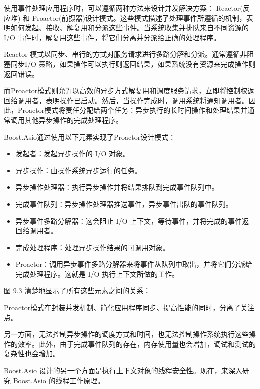 使用事件处理应用程序时，可以遵循两种方法来设计并发解决方案： Reactor(反应堆) 和 Proactor(前摄器)设计模式。这些模式描述了处理事件所遵循的机制，表明如何发起、接收、解复用和分派这些事件。当系统收集并排队来自不同资源的 I/O 事件时，解复用这些事件，将它们分离并分派给正确的处理程序。

Reactor 模式以同步、串行的方式对服务请求进行多路分解和分派。通常遵循非阻塞同步I/O 策略，如果操作可以执行则返回结果，如果系统没有资源来完成操作则返回错误。

而Proactor模式则允许以高效的异步方式解复用和调度服务请求，立即将控制权返回给调用者，表明操作已启动。然后，当操作完成时，调用系统将通知调用者。因此，Proactor模式将责任分配给两个任务：异步执行的长时间操作和处理结果并通常调用其他异步操作的完成处理程序。

Boost.Asio通过使用以下元素实现了Proactor设计模式：

\begin{itemize}
\item
发起者：发起异步操作的 I/O 对象。

\item
异步操作：由操作系统异步运行的任务。

\item
异步操作处理器：执行异步操作并将结果排队到完成事件队列中。

\item
完成事件队列：异步操作处理器推送事件，异步事件出队的事件队列。

\item
异步事件多路分解器：这会阻止 I/O 上下文，等待事件，并将完成的事件返回给调用者。

\item
完成处理程序：处理异步操作结果的可调用对象。

\item
Proactor：调用异步事件多路分解器来将事件从队列中取出，并将它们分派给完成处理程序。这就是 I/O 执行上下文所做的工作。
\end{itemize}

图 9.3 清楚地显示了所有这些元素之间的关系：


Proactor模式在封装并发机制、简化应用程序同步、提高性能的同时，分离了关注点。

另一方面，无法控制异步操作的调度方式和时间，也无法控制操作系统执行这些操作的效率。此外，由于完成事件队列的存在，内存使用量也会增加，调试和测试的复杂性也会增加。

Boost.Asio 设计的另一个方面是执行上下文对象的线程安全性。现在，来深入研究 Boost.Asio 的线程工作原理。

































